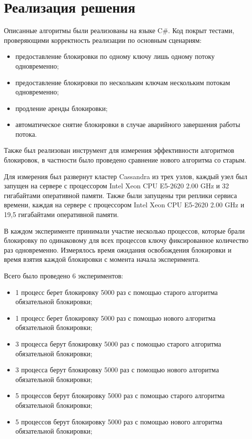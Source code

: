 \section{Реализация решения}

Описанные алгоритмы были реализованы на языке C\#. Код покрыт тестами, проверяющими корректность реализации по основным сценариям:
\begin{itemize}
	\item предоставление блокировки по одному ключу лишь одному потоку одновременно;
	\item предоставление блокировки по нескольким ключам нескольким потокам одновременно;
	\item продление аренды блокировки;
	\item автоматическое снятие блокировки в случае аварийного завершения работы потока.
\end{itemize}

Также был реализован инструмент для измерения эффективности алгоритмов блокировок, в частности было проведено сравнение нового алгоритма со старым.

Для измерения был развернут кластер Cassandra из трех узлов, каждый узел был запущен на сервере с процессором Intel Xeon CPU E5-2620 2.00 GHz и 32 гигабайтами оперативной памяти.
Также были запущены три реплики сервиса времени, каждая на сервере с процессором Intel Xeon CPU E5-2620 2.00 GHz и 19,5 гигабайтами оперативной памяти.

В каждом эксперименте принимали участие несколько процессов, которые брали блокировку по одинаковому для всех процессов ключу фиксированное количество раз одновременно.
Измерялось время ожидания освобождения блокировки и время взятия каждой блокировки с момента начала эксперимента.

Всего было проведено 6 экспериментов:
\begin{itemize}
	\item 1 процесс берет блокировку 5000 раз с помощью старого алгоритма обязательной блокировки;
	\item 1 процесс берет блокировку 5000 раз с помощью нового алгоритма обязательной блокировки;
	\item 3 процесса берут блокировку 5000 раз с помощью старого алгоритма обязательной блокировки;
	\item 3 процесса берут блокировку 5000 раз с помощью нового алгоритма обязательной блокировки;
	\item 5 процессов берут блокировку 5000 раз с помощью старого алгоритма обязательной блокировки;
	\item 5 процессов берут блокировку 5000 раз с помощью нового алгоритма обязательной блокировки;
\end{itemize}

